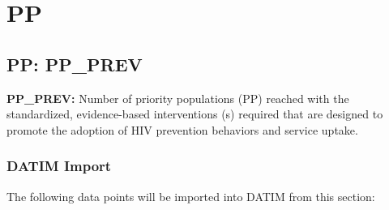 \documentclass[
  openany]{book}
\begin{document}
\hypertarget{pp}{%
\chapter{PP}\label{pp}}

\hypertarget{pp-pp_prev}{%
\section{PP: PP\_PREV}\label{pp-pp_prev}}

\textbf{PP\_PREV:} Number of priority populations (PP) reached with the
standardized, evidence-based interventions (s) required that are
designed to promote the adoption of HIV prevention behaviors and service
uptake.

\begin{table}
\centering\begingroup\fontsize{12}{14}\selectfont

\endgroup{}
\end{table}

\hypertarget{datim-import-53}{%
\subsection{DATIM Import}\label{datim-import-53}}

The following data points will be imported into DATIM from this section:
\end{document}
